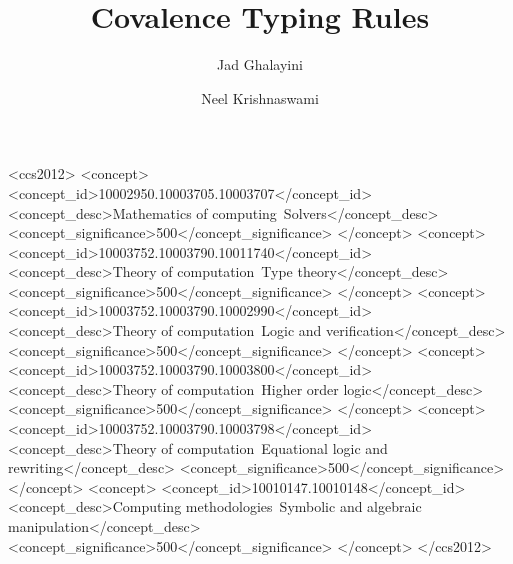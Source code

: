 \documentclass[acmsmall,screen,review]{acmart}
\begin{document}
\title{Covalence Typing Rules}

\author{Jad Ghalayini}

\author{Neel Krishnaswami}

\begin{CCSXML}
<ccs2012>
   <concept>
       <concept_id>10002950.10003705.10003707</concept_id>
       <concept_desc>Mathematics of computing~Solvers</concept_desc>
       <concept_significance>500</concept_significance>
       </concept>
   <concept>
       <concept_id>10003752.10003790.10011740</concept_id>
       <concept_desc>Theory of computation~Type theory</concept_desc>
       <concept_significance>500</concept_significance>
       </concept>
   <concept>
       <concept_id>10003752.10003790.10002990</concept_id>
       <concept_desc>Theory of computation~Logic and verification</concept_desc>
       <concept_significance>500</concept_significance>
       </concept>
   <concept>
       <concept_id>10003752.10003790.10003800</concept_id>
       <concept_desc>Theory of computation~Higher order logic</concept_desc>
       <concept_significance>500</concept_significance>
       </concept>
   <concept>
       <concept_id>10003752.10003790.10003798</concept_id>
       <concept_desc>Theory of computation~Equational logic and rewriting</concept_desc>
       <concept_significance>500</concept_significance>
       </concept>
   <concept>
       <concept_id>10010147.10010148</concept_id>
       <concept_desc>Computing methodologies~Symbolic and algebraic manipulation</concept_desc>
       <concept_significance>500</concept_significance>
       </concept>
 </ccs2012>
\end{CCSXML}




\maketitle
\end{document}
